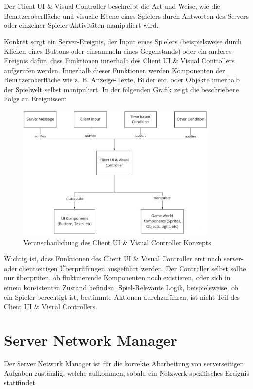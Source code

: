 Der Client UI \& Visual Controller beschreibt die Art und Weise, wie die Benutzeroberfläche und visuelle Ebene eines Spielers durch Antworten des Servers oder einzelner Spieler-Aktivitäten manipuliert wird.

Konkret sorgt ein Server-Ereignis, der Input eines Spielers (beispielsweise durch Klicken eines Buttons oder einsammeln eines Gegenstands) oder ein anderes Ereignis dafür, dass Funktionen innerhalb des Client UI \& Visual Controllers aufgerufen werden. Innerhalb dieser Funktionen werden Komponenten der Benutzeroberfläche wie z. B. Anzeige-Texte, Bilder etc. oder Objekte innerhalb der Spielwelt selbst manipuliert. In der folgenden Grafik zeigt die beschriebene Folge an Ereignissen:

\begin{figure}[H]
	\centering
	\includegraphics[width=100mm]{images/Client_UI_und_Visual_Konzept.jpg}
	\caption[Client UI \& Visual Controller Diagramm]{Veranschaulichung des Client UI \& Visual Controller Konzepts}
	\label{pic:Client_UI_und_Visual_Konzept}
\end{figure}

Wichtig ist, dass Funktionen des Client UI \& Visual Controller erst nach server- oder clientseitigen Überprüfungen ausgeführt werden. Der Controller selbst sollte nur überprüfen, ob fluktuierende Komponenten noch existieren, oder sich in einem konsistenten Zustand befinden. Spiel-Relevante Logik, beispielsweise, ob ein Spieler berechtigt ist, bestimmte Aktionen durchzuführen, ist nicht Teil des Client UI \& Visual Controllers.

\section{Server Network Manager}

Der Server Network Manager ist für die korrekte Abarbeitung von serverseitigen Aufgaben zuständig, welche aufkommen, sobald ein Netzwerk-spezifisches Ereignis stattfindet.

